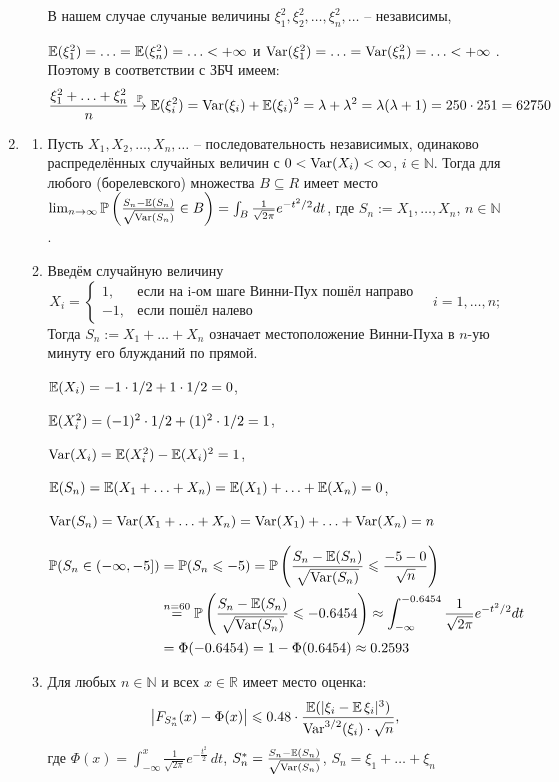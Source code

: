 \begin{enumerate}
\begin{enumerate}
В нашем случае случаные величины $\xi_1^2, \xi_2^2, \ldots, \xi_n^2, \ldots$ – независимы,

$\operatorname{\mathbb{E}}(\xi_1^2) = \ldots = \operatorname{\mathbb{E}}(\xi_n^2) = \ldots < + \infty$ и $\operatorname{Var}(\xi_1^2) = \ldots = \operatorname{Var}(\xi_n^2) = \ldots < + \infty$ . Поэтому в соответствии с ЗБЧ имеем:
\[
\frac{\xi_1^2 +\ldots+ \xi_n^2}{n} \stackrel{\operatorname{\mathbb{P}}}{\to} \operatorname{\mathbb{E}}(\xi_i^2) = \operatorname{Var}(\xi_i) +\operatorname{\mathbb{E}}(\xi_i)^2 = \lambda + \lambda^2 = \lambda(\lambda+1) = 250\cdot251 = 62750
\]
\end{enumerate}

\item \begin{enumerate}
\item Пусть $X_1, X_2, \ldots, X_n, \ldots$ – последовательность независимых, одинаково распределённых случайных величин с $0<\operatorname{Var}(X_i)<\infty$, $i \in \mathbb{N}$.  Тогда для любого (борелевского) множества $B \subseteq R$ имеет место $\lim_{n \to \infty} \operatorname{\mathbb{P}}\left(\frac{S_n - \operatorname{\mathbb{E}}(S_n)}{\sqrt{\operatorname{Var}(S_n)}} \in B\right) = \int_B \frac{1}{\sqrt{2\pi}}e^{-t^2/2} dt$, где $S_n := X_1, \ldots, X_n$, $n \in \mathbb{N}$.
\item Введём случайную величину
\[
X_i = \begin{cases}
1, & \text{если на i-ом шаге Винни-Пух пошёл направо} \\
-1, & \text{если пошёл налево}
\end{cases}
\quad i=1,\ldots, n;
\]
Тогда $S_n := X_1 +\ldots+X_n$ означает местоположение Винни-Пуха в $n$-ую минуту его блужданий по прямой.

$\operatorname{\mathbb{E}}(X_i) = -1 \cdot 1/2 + 1 \cdot 1/2 = 0$,

$\operatorname{\mathbb{E}}(X_i^2) = (-1)^2 \cdot 1/2 + (1)^2 \cdot 1/2 = 1$,

$\operatorname{Var}(X_i) = \operatorname{\mathbb{E}}(X_i^2) - \operatorname{\mathbb{E}}(X_i)^2 = 1$,

$\operatorname{\mathbb{E}}(S_n) = \operatorname{\mathbb{E}}(X_1 + \ldots + X_n ) = \operatorname{\mathbb{E}}(X_1) + \ldots + \operatorname{\mathbb{E}}(X_n) = 0$,

$\operatorname{Var}(S_n) = \operatorname{Var}(X_1 + \ldots + X_n ) = \operatorname{Var}(X_1) + \ldots + \operatorname{Var}(X_n) = n$

\begin{align*}
\operatorname{\mathbb{P}}(S_n \in (-\infty, -5]) &= \operatorname{\mathbb{P}}(S_n \leqslant -5) = \operatorname{\mathbb{P}}\left( \frac{S_n-\operatorname{\mathbb{E}}(S_n)}{\sqrt{\operatorname{Var}(S_n)}} \leqslant \frac{-5-0}{\sqrt{n}} \right)  \\
&\stackrel{n=60}{=}\operatorname{\mathbb{P}}\left( \frac{S_n-\operatorname{\mathbb{E}}(S_n)}{\sqrt{\operatorname{Var}(S_n)}} \leqslant -0.6454\right) \approx \int_{-\infty}^{-0.6454} \frac{1}{\sqrt{2\pi}} e^{-t^2/2} dt \\
&= \Phi(-0.6454) = 1-\Phi(0.6454) \approx0.2593
\end{align*}
\item Для любых $n \in \mathbb{N}$ и всех $x \in \mathbb{R}$ имеет место оценка:
\[
\bigl|F_{S_n^{*}}(x) - \Phi(x)\bigr| \leqslant 0.48 \cdot \frac{\operatorname{\mathbb{E}}(|\xi_i - \operatorname{\mathbb{E}}\xi_i|^3)}{\operatorname{Var}^{3/2}(\xi_i)\cdot\sqrt{n}} \text{,}
\]
где $\Phi(x) = \int_{-\infty}^{x}\frac{1}{\sqrt{2\pi}}e^{-\frac{t^2}{2}}\,dt$, \; $S_n^* = \frac{S_n - \operatorname{\mathbb{E}}(S_n)}{\sqrt{\operatorname{Var}(S_n)}}$, \; $S_n = \xi_1 + \ldots + \xi_n$


\end{enumerate}
\end{enumerate}
